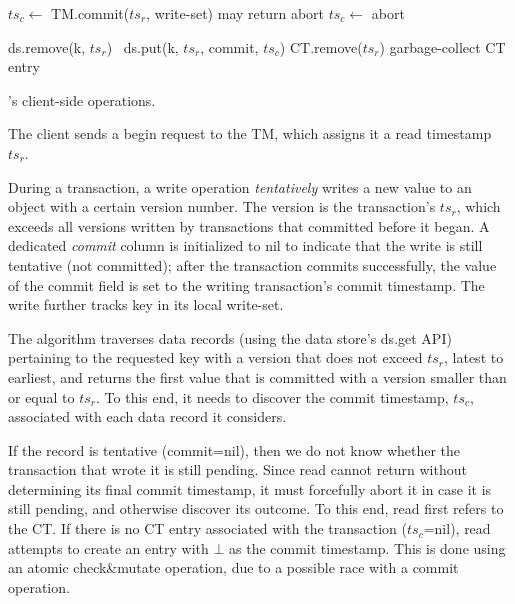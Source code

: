 \begin{algorithm}[htb]
\begin{algorithmic}
      	\State $ts_c \leftarrow$ TM.commit($ts_r$, write-set) \Comment may return abort
   		 	\State $ts_c \leftarrow$ abort  %
   		 \EndIf
	\EndIf

			 ds.remove(k, $ts_r$)  	
			{\Else\ ds.put(k, $ts_r$, commit, $ts_c$)}
			\EndIf
	\EndFor
	\State CT.remove($ts_r$) \Comment garbage-collect CT entry
\EndProcedure
      
  \end{algorithmic}
  \caption{\sysll's client-side operations.} 
  \label{fig:get-pseudocode}
\end{algorithm} 




The client sends a begin request to the TM, which assigns it a read timestamp $ts_r$.

 During a transaction, a write operation   \emph{tentatively} writes a new value to an object with a certain version number.
The version is the transaction's $ts_r$, which exceeds all versions written by transactions that committed before it  began. 
A dedicated \emph{commit} column is initialized to nil to indicate that the write is still tentative (not committed); 
after the transaction commits successfully, the value of the commit field is set to the writing transaction's commit timestamp.
The write further tracks key in its local write-set.

The algorithm traverses data  records (using the data store's ds.get API) pertaining
to the requested key with a version that does not exceed $ts_r$, latest to earliest, and returns the first value that is committed
with a  version smaller than or equal to $ts_r$. To this end, it needs to discover the commit timestamp, $ts_c$, associated with
each data record it considers. 

If the record is tentative (commit=nil), then we do not know whether the transaction that wrote it is still pending. 
Since read cannot return without determining its final commit timestamp, 
it must forcefully abort it in case it is still pending, and otherwise discover its outcome.
To this end, read first refers to the CT.
If there is no CT entry associated with the transaction ($ts_c$=nil), 
read attempts to create an entry with $\bot$ as the commit timestamp. 
This is done using an atomic {check\&mutate} operation, due to a possible 
race with a commit operation. %

